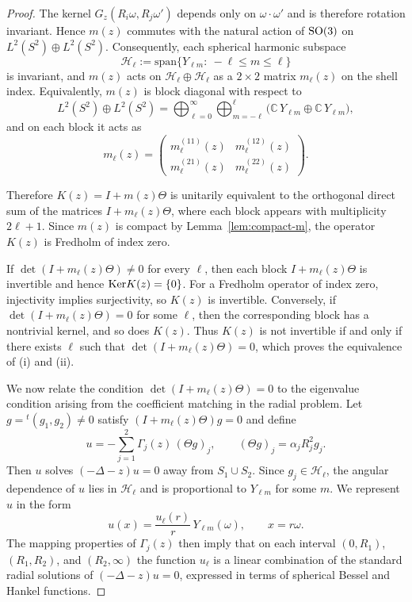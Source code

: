 \documentclass[a4paper,11pt]{article}
\numberwithin{equation}{section}
\renewcommand{\ker}{\text{\rm Ker}}
\theoremstyle{definition}
\theoremstyle{remark}
\begin{document}
\begin{proof}
The kernel $G_z(R_i\omega,R_j\omega')$ depends only on $\omega\cdot\omega'$ and is
therefore rotation invariant.
Hence $m(z)$ commutes with the natural action of ${\rm SO}(3)$ on
$L^2(S^2)\oplus L^2(S^2)$.
Consequently, each spherical harmonic subspace
$$
\mathcal H_\ell:=\mathrm{span}\{Y_{\ell m}:\ -\ell\le m\le\ell\}
$$
is invariant, and $m(z)$ acts on $\mathcal H_\ell\oplus\mathcal H_\ell$ as a
$2\times2$ matrix $m_\ell(z)$ on the shell index.
Equivalently, $m(z)$ is block diagonal with respect to
$$
L^2(S^2)\oplus L^2(S^2)
=
\bigoplus_{\ell=0}^{\infty}\bigoplus_{m=-\ell}^{\ell}
\bigl(\mathbb C\,Y_{\ell m}\oplus \mathbb C\,Y_{\ell m}\bigr),
$$
and on each block it acts as
$$
m_\ell(z)=
\left(
\begin{array}{cc}
m^{(11)}_\ell(z) & m^{(12)}_\ell(z)\\[2pt]
m^{(21)}_\ell(z) & m^{(22)}_\ell(z)
\end{array}
\right).
$$

Therefore $K(z)=I+m(z)\Theta$ is unitarily equivalent to the orthogonal direct sum of
the matrices $I+m_\ell(z)\Theta$, where each block appears with multiplicity
$2\ell+1$.
Since $m(z)$ is compact by Lemma~\ref{lem:compact-m}, the operator $K(z)$ is
Fredholm of index zero.

If $\det(I+m_\ell(z)\Theta)\ne 0$ for every $\ell$, then each block
$I+m_\ell(z)\Theta$ is invertible and hence $\ker K(z)=\{0\}$.
For a Fredholm operator of index zero, injectivity implies surjectivity, so
$K(z)$ is invertible.
Conversely, if $\det(I+m_\ell(z)\Theta)=0$ for some $\ell$, then the
corresponding block has a nontrivial kernel, and so does $K(z)$.
Thus $K(z)$ is not invertible if and only if there exists $\ell$ such that
$\det(I+m_\ell(z)\Theta)=0$, which proves the equivalence of (i) and (ii).

We now relate the condition $\det(I+m_\ell(z)\Theta)=0$ to the eigenvalue
condition arising from the coefficient matching in the radial problem.
Let $g={}^{t}(g_1,g_2)\ne0$ satisfy $(I+m_\ell(z)\Theta)g=0$ and define
$$
u = -\sum_{j=1}^{2}\Gamma_j(z)\,(\Theta g)_j,
\qquad
(\Theta g)_j=\alpha_j R_j^2 g_j .
$$
Then $u$ solves $(-\Delta-z)u=0$ away from $S_1\cup S_2$.
Since $g_j\in\mathcal H_\ell$, the angular dependence of $u$ lies in
$\mathcal H_\ell$ and is proportional to $Y_{\ell m}$ for some $m$.
We represent $u$ in the form
\[
u(x)=\frac{u_\ell(r)}{r}\,Y_{\ell m}(\omega),\qquad x=r\omega.
\]
The mapping properties of $\Gamma_j(z)$ then imply that on each interval
$(0,R_1)$, $(R_1,R_2)$, and $(R_2,\infty)$ the function $u_\ell$ is a linear
combination of the standard radial solutions of $(-\Delta-z)u=0$, expressed in
terms of spherical Bessel and Hankel functions.


\end{proof}
\end{document}
